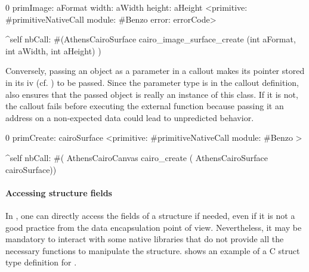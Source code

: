 \begin{stcode}[
	label={lst:ffi-calloutOpaqueStruct},
	caption={Example of returning a structure by reference}]{0}
primImage: aFormat width: aWidth height: aHeight
	<primitive: #primitiveNativeCall
	 module: #Benzo
     error: errorCode>

	^self nbCall: #(AthensCairoSurface
		cairo_image_surface_create (int aFormat,
									int aWidth,
									int aHeight) )
\end{stcode}

\noindent Conversely, passing an  object as a parameter in a callout makes its pointer stored in its  iv (cf. ) to be passed.
Since the parameter type is  in the callout definition, \NB also ensures that the passed object is really an instance of this class.
If it is not, the callout fails before executing the external function because passing it an address on a non-expected data could lead to unpredicted behavior.

\begin{stcode}[
	label={lst:ffi-calloutOpaqueStructParameter},
	caption={Example of passing a structure by reference}]{0}
primCreate: cairoSurface
	<primitive: #primitiveNativeCall module: #Benzo >

	^self nbCall: #(
        AthensCairoCanvas cairo_create (
                  AthensCairoSurface cairoSurface))
\end{stcode}


\paragraph{Accessing structure fields}
In \NB, one can directly access the fields of a structure if needed, even if it is not a good practice from the data encapsulation point of view.
Nevertheless, it may be mandatory to interact with some native libraries that do not provide all the necessary functions to manipulate the structure.
 shows an example of a C struct type definition for .

